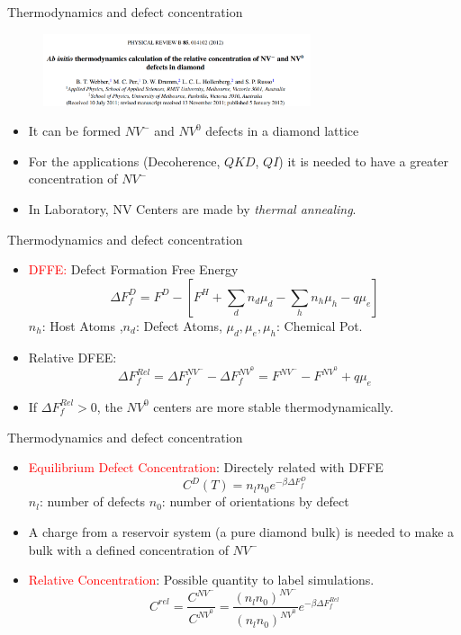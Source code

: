 \documentclass[11pt]{beamer}
\begin{document}
\begin{frame}{Thermodynamics and defect concentration}
\begin{figure}
 \centering
    \includegraphics[width=0.7\textwidth]{pap4.png}
 \end{figure}
  \begin{itemize}
     \item It can be formed $NV^-$ and $NV^0$ defects in a diamond lattice
     \item For the applications (Decoherence, $QKD$, $QI$) it is needed to have a greater concentration of $NV^-$
     \item In Laboratory, NV Centers are made by \textit{thermal annealing}.
 \end{itemize}
\end{frame}
\begin{frame}{Thermodynamics and defect concentration}
\begin{itemize}
     \item \textcolor{red}{DFFE:} Defect Formation Free Energy \begin{equation}\Delta F_{f}^D=F^D-[F^H+\sum_d n_d\mu_d-\sum_h n_h\mu_h-q\mu_e]\end{equation}
     $n_h$: Host Atoms ,$n_d$: Defect Atoms, $\mu_d, \mu_e, \mu_h$: Chemical Pot.
     \item Relative DFEE:
     \begin{equation}\Delta F_f^{Rel}=\Delta F_f^{NV^-}-\Delta F_f^{NV^0}=F^{NV^-}-F^{NV^0}+q\mu_e\end{equation}
     \item  If $\Delta F_f^{Rel}>0$, the $NV^0$ centers are more stable thermodynamically. 
\end{itemize}
\end{frame}
\begin{frame}{Thermodynamics and defect concentration}
\begin{itemize}
     \item \textcolor{red}{Equilibrium Defect Concentration}: Directely related with DFFE \begin{equation}C^D (T)=n_ln_0e^{-\beta\Delta F_f^D}\end{equation}
     $n_l$: number of defects $n_0$: number of orientations by defect 
     \item A charge from a reservoir system (a pure diamond bulk) is needed to make a bulk with a defined concentration of $NV^-$
     \item \textcolor{red}{Relative Concentration}: Possible quantity to label simulations.
     \begin{equation}C^{rel}=\frac{C^{NV^-}}{C^{NV^0}}=\frac{(n_ln_0)^{NV^-}}{(n_ln_0)^{NV^0}}e^{-\beta\Delta F_f^{Rel}}\end{equation}
\end{itemize}
\end{frame}
\end{document}
